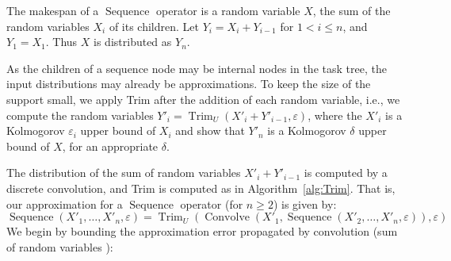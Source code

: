 \documentclass[review]{elsarticle}
\DeclareMathOperator{\Trim}{Trim}
\DeclareMathOperator{\Sequence}{Sequence}
\DeclareMathOperator{\Convolve}{Convolve}
\begin{document}



The makespan of a $\Sequence$ operator is a random variable $X$, the sum 
of the random variables $X_i$ of its children.
Let $Y_i = X_i + Y_{i-1}$ for $1< i \leq n$, and $Y_1=X_1$.
Thus $X$ is distributed as $Y_n$.

As the children of a sequence node may be internal nodes in the task tree,
the input distributions may already be approximations. To keep the size of
the support small, we apply Trim after the addition of each random variable, i.e., 
we compute the random variables 
$Y'_i = \Trim_U(X'_i + Y'_{i-1}, \varepsilon)$,
where the $X'_i$ is a Kolmogorov $\varepsilon_i $ upper bound of $X_i$
and show that $Y'_n$ is a Kolmogorov $\delta $ upper bound of $X$, for an appropriate $\delta $.

The distribution of the sum of random variables $X'_i + Y'_{i-1}$ is 
computed by a discrete convolution, and Trim is
computed as in Algorithm~\ref{alg:Trim}. That is, our approximation for a $\Sequence$ operator (for $n\geq 2$) is given by: 
\begin{equation}
\label{eq:sequence}
\Sequence(X'_1,\dots , X'_n,  \varepsilon) 
= \Trim_U(\Convolve(X'_1, \Sequence(X'_2, \dots , X'_n, \varepsilon)), \varepsilon)
\end{equation}
We begin by bounding the approximation error propagated by convolution (sum of random variables ):
\end{document}
